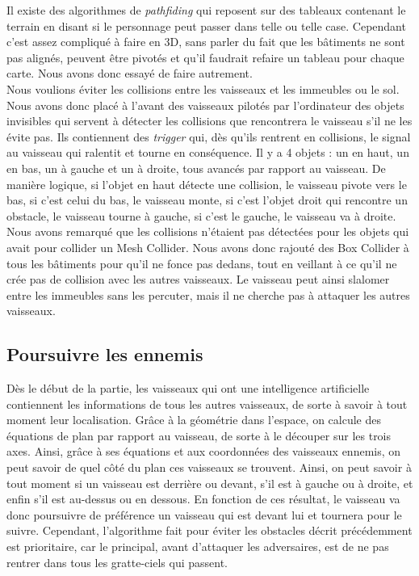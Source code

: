 \documentclass[12pt, titlepage]{article}
\begin{document}
\begin{spacing}{1.5}
Il existe des algorithmes de \textit{pathfiding} qui reposent sur des tableaux contenant le terrain en disant si le personnage peut passer dans telle ou telle case. Cependant c'est assez compliqué à faire en 3D, sans parler du fait que les bâtiments ne sont pas alignés, peuvent être pivotés et qu'il faudrait refaire un tableau pour chaque carte. Nous avons donc essayé de faire autrement.\\

Nous voulions éviter les collisions entre les vaisseaux et les immeubles ou le sol. Nous avons donc placé à l'avant des vaisseaux pilotés par l'ordinateur des objets invisibles qui servent à détecter les collisions que rencontrera le vaisseau s'il ne les évite pas. Ils contiennent des \textit{trigger} qui, dès qu'ils rentrent en collisions, le signal au vaisseau qui ralentit et tourne en conséquence. Il y a 4 objets : un en haut, un en bas, un à gauche et un à droite, tous avancés par rapport au vaisseau. De manière logique, si l'objet en haut détecte une collision, le vaisseau pivote vers le bas, si c'est celui du bas, le vaisseau monte, si c'est l'objet droit qui rencontre un obstacle, le vaisseau tourne à gauche, si c'est le gauche, le vaisseau va à droite.\\

Nous avons remarqué que les collisions n'étaient pas détectées pour les objets qui avait pour collider un Mesh Collider. Nous avons  donc rajouté des Box Collider à tous les bâtiments pour qu’il ne fonce pas dedans, tout en veillant à ce qu'il ne crée  pas de collision avec les autres vaisseaux. Le vaisseau peut ainsi slalomer entre les immeubles sans les percuter, mais il ne cherche pas à attaquer les autres vaisseaux.\\

\subsection{Poursuivre les ennemis}

Dès le début de la partie, les vaisseaux qui ont une intelligence artificielle contiennent les informations de tous les autres vaisseaux, de sorte à savoir à tout moment leur localisation. Grâce à la géométrie dans l'espace, on calcule des équations de plan par rapport au vaisseau, de sorte à le découper sur les trois axes. Ainsi, grâce à ses équations et aux coordonnées des vaisseaux ennemis, on peut savoir de quel côté du plan ces vaisseaux se trouvent. Ainsi, on peut savoir à tout moment si un vaisseau est derrière ou devant, s'il est à gauche ou à droite, et enfin s'il est au-dessus ou en dessous. En fonction de ces résultat, le vaisseau va donc poursuivre de préférence un vaisseau qui est devant lui et tournera pour le suivre. Cependant, l'algorithme fait pour éviter les obstacles décrit précédemment est prioritaire, car le principal, avant d'attaquer les adversaires, est de ne pas rentrer dans tous les gratte-ciels qui passent.


\end{spacing}
\end{document}
